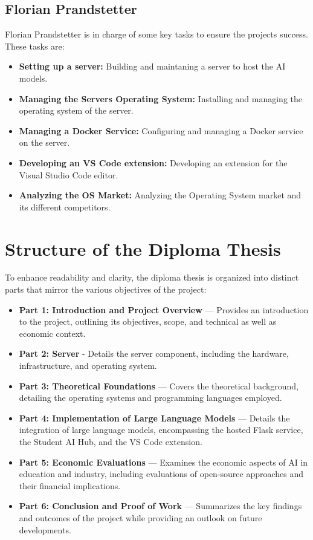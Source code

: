 \subsection{Florian Prandstetter}
\label{sec:Florina-Prandstetter}

Florian Prandstetter is in charge of some key tasks to ensure the projects success.
These tasks are:

\begin{itemize}
    \item \textbf{Setting up a server:} Building and maintaning a server to host the AI models.
    \item \textbf{Managing the Servers Operating System:} Installing and managing the operating system of the server.
    \item \textbf{Managing a Docker Service:} Configuring and managing a Docker service on the server.
    \item \textbf{Developing an VS Code extension:} Developing an extension for the Visual Studio Code editor.
    \item \textbf{Analyzing the OS Market:} Analyzing the Operating System market and its different competitors.
\end{itemize}

\section{Structure of the Diploma Thesis}

To enhance readability and clarity, the diploma thesis is organized into distinct parts that mirror the various objectives of the project:

\begin{itemize}
    \item \textbf{Part 1: Introduction and Project Overview} — Provides an introduction to the project, outlining its objectives, scope, and technical as well as economic context.
    \item \textbf{Part 2: Server} - Details the server component, including the hardware, infrastructure, and operating system.
    \item \textbf{Part 3: Theoretical Foundations} — Covers the theoretical background, detailing the operating systems and programming languages employed.
    \item \textbf{Part 4: Implementation of Large Language Models} — Details the integration of large language models, encompassing the hosted Flask service, the Student AI Hub, and the VS Code extension.
    \item \textbf{Part 5: Economic Evaluations} — Examines the economic aspects of AI in education and industry, including evaluations of open-source approaches and their financial implications.
    \item \textbf{Part 6: Conclusion and Proof of Work} — Summarizes the key findings and outcomes of the project while providing an outlook on future developments.
\end{itemize}

